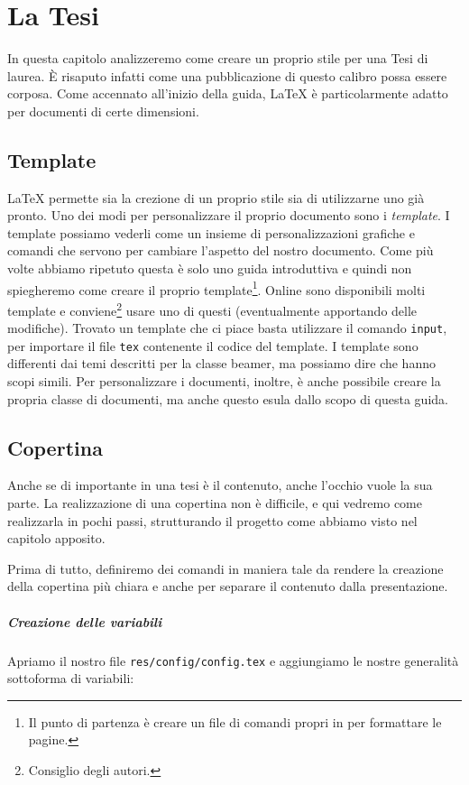 \chapter{La Tesi}
In questa capitolo analizzeremo come creare un proprio stile per una Tesi di
laurea. È risaputo infatti come una pubblicazione di questo calibro possa
essere corposa. Come accennato all'inizio della guida, \LaTeX{} è
particolarmente adatto per documenti di certe dimensioni.

\section{Template}
\LaTeX{} permette sia la crezione di un proprio stile sia di utilizzarne uno 
già pronto. Uno dei modi per personalizzare il proprio documento sono i\textit{
template}. I template possiamo vederli come un insieme di personalizzazioni 
grafiche e comandi che servono per cambiare l'aspetto del nostro documento. 
Come più volte abbiamo ripetuto questa è solo uno guida introduttiva e quindi 
non spiegheremo come creare il proprio template\footnote{Il punto di partenza 
è creare un file di comandi propri in per formattare le pagine.}. Online sono 
disponibili molti template e conviene\footnote{Consiglio degli autori.} usare 
uno di questi (eventualmente apportando delle modifiche). Trovato un template 
che ci piace basta utilizzare il comando \texttt{input}, per importare il file 
\texttt{tex} contenente il codice del template. I template sono differenti dai 
temi descritti per la classe beamer, ma possiamo dire che hanno scopi simili. 
Per personalizzare i documenti, inoltre, è anche possibile creare la propria 
classe di documenti, ma anche questo esula dallo scopo di questa guida.

\section{Copertina}
Anche se di importante in una tesi è il contenuto, anche l'occhio vuole la sua
parte. La realizzazione di una copertina non è difficile, e qui vedremo come
realizzarla in pochi passi, strutturando il progetto come abbiamo visto nel
capitolo apposito. %

Prima di tutto, definiremo dei comandi in maniera tale da rendere la creazione
della copertina più chiara e anche per separare il contenuto dalla
presentazione.

\paragraph*{Creazione delle variabili} Apriamo il nostro file
\texttt{res/config/config.tex} e aggiungiamo le nostre generalità sottoforma di
variabili:


